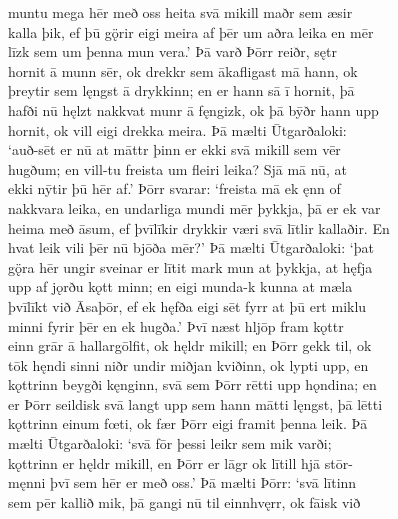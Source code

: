 \documentclass[12pt,letterpaper]{book}
\begin{document}
\begin{linenumbers}
muntu mega hēr með oss heita svā mikill maðr sem æsir\\
kalla þik, ef þū gǫ̈rir eigi meira af þēr um aðra leika en mēr\\
līzk sem um þenna mun vera.'  Þā varð Þōrr reiðr, sętr\\
hornit ā munn sēr, ok drekkr sem ākafligast mā hann, ok\\
þreytir sem lęngst ā drykkinn; en er hann sā ī hornit, þā\\
hafði nū hęlzt nakkvat munr ā fęngizk, ok þā bȳðr hann upp\\
hornit, ok vill eigi drekka meira.  Þā mælti Ūtgarðaloki:\\
`auð-sēt er nū at māttr þinn er ekki svā mikill sem vēr\\
hugðum; en vill-tu freista um fleiri leika?  Sjā mā nū, at\\
ekki nȳtir þū hēr af.'  Þōrr svarar: `freista mā ek ęnn of\\
nakkvara leika, en undarliga mundi mēr þykkja, þā er ek var\\
heima með āsum, ef þvīlīkir drykkir væri svā lītlir kallaðir.  En\\
hvat leik vili þēr nū bjōða mēr?'  Þā mælti Ūtgarðaloki: `þat\\
gǫ̈ra hēr ungir sveinar er lītit mark mun at þykkja, at hęfja\\
upp af jǫrðu kǫtt minn; en eigi munda-k kunna at mæla\\
þvīlīkt við Āsaþōr, ef ek hęfða eigi sēt fyrr at þū ert miklu\\
minni fyrir þēr en ek hugða.'  Þvī næst hljōp fram kǫttr\\
einn grār ā hallargōlfit, ok hęldr mikill; en Þōrr gekk til, ok\\
tōk hęndi sinni niðr undir miðjan kviðinn, ok lypti upp, en\\
kǫttrinn beygði kęnginn, svā sem Þōrr rētti upp hǫndina; en\\
er Þōrr seildisk svā langt upp sem hann mātti lęngst, þā lētti\\
kǫttrinn einum fœti, ok fær Þōrr eigi framit þenna leik.  Þā\\
mælti Ūtgarðaloki: `svā fōr þessi leikr sem mik varði;\\
kǫttrinn er hęldr mikill, en Þōrr er lāgr ok lītill hjā stōr-\\
męnni þvī sem hēr er með oss.'  Þā mælti Þōrr: `svā lītinn\\
sem pēr kallið mik, þā gangi nū til einnhvęrr, ok fāisk við\\

\end{linenumbers}
\end{document}
